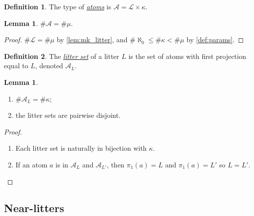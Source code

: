 \documentclass{article}
\newcommand{\cdef}[3]{\href{https://leanprover-community.github.io/con-nf/doc/ConNF/#1.html\#ConNF.#2}{\emph{#3}}}
\theoremstyle{definition}
\newtheorem{definition}{Definition}[section]
\newtheorem{lemma}[theorem]{Lemma}
\theoremstyle{remark}
\begin{document}
\begin{definition}
    The type of \cdef{Atom/Atom}{Atom}{atoms} is \( \mathcal A = \mathcal L \times \kappa \).
\end{definition}
\begin{lemma}
    \label{lem:mk_atom}
    \( \#\mathcal A = \#\mu \).
\end{lemma}
\begin{proof}
    \( \#\mathcal L = \#\mu \) by \cref{lem:mk_litter}, and \( \#\aleph_0 \leq \#\kappa < \#\mu \) by \cref{def:params}.
\end{proof}
\begin{definition}
    The \cdef{Atom/Atom}{litterSet}{litter set} of a litter \( L \) is the set of atoms with first projection equal to \( L \), denoted \( \mathcal A_L \).
\end{definition}
\begin{lemma}
    \label{lem:litterSet}
    \begin{enumerate}
        \item \( \#\mathcal A_L = \#\kappa \);
        \item the litter sets are pairwise disjoint.
    \end{enumerate}
\end{lemma}
\begin{proof}
    \begin{enumerate}
        \item Each litter set is naturally in bijection with \( \kappa \).
        \item If an atom \( a \) is in \( \mathcal A_L \) and \( \mathcal A_{L'} \), then \( \pi_1(a) = L \) and \( \pi_1(a) = L' \) so \( L = L' \).
    \end{enumerate}
\end{proof}

\subsection{Near-litters}
\end{document}
